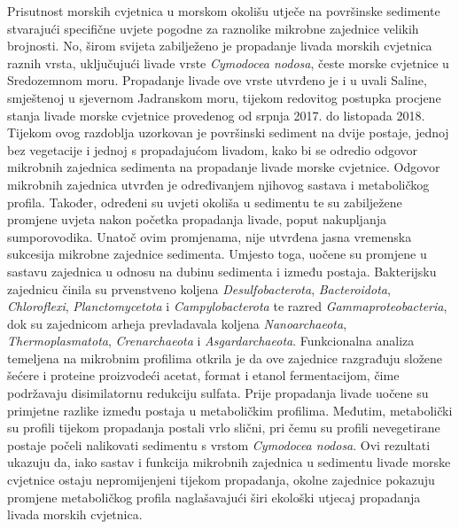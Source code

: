 \documentclass[
  12 pt,
]{book}
\begin{document}
{Prisutnost morskih cvjetnica u morskom okolišu utječe na površinske sedimente stvarajući specifične uvjete pogodne za raznolike mikrobne zajednice velikih brojnosti. No, širom svijeta zabilježeno je propadanje livada morskih cvjetnica raznih vrsta, uključujući livade vrste \emph{Cymodocea nodosa}, česte morske cvjetnice u Sredozemnom moru. Propadanje livade ove vrste utvrđeno je i u uvali Saline, smještenoj u sjevernom Jadranskom moru, tijekom redovitog postupka procjene stanja livade morske cvjetnice provedenog od srpnja 2017. do listopada 2018. Tijekom ovog razdoblja uzorkovan je površinski sediment na dvije postaje, jednoj bez vegetacije i jednoj s propadajućom livadom, kako bi se odredio odgovor mikrobnih zajednica sedimenta na propadanje livade morske cvjetnice. Odgovor mikrobnih zajednica utvrđen je određivanjem njihovog sastava i metaboličkog profila. Također, određeni su uvjeti okoliša u sedimentu te su zabilježene promjene uvjeta nakon početka propadanja livade, poput nakupljanja sumporovodika. Unatoč ovim promjenama, nije utvrđena jasna vremenska sukcesija mikrobne zajednice sedimenta. Umjesto toga, uočene su promjene u sastavu zajednica u odnosu na dubinu sedimenta i između postaja. Bakterijsku zajednicu činila su prvenstveno koljena \emph{Desulfobacterota}, \emph{Bacteroidota}, \emph{Chloroflexi}, \emph{Planctomycetota} i \emph{Campylobacterota} te razred \emph{Gammaproteobacteria}, dok su zajednicom arheja prevladavala koljena \emph{Nanoarchaeota}, \emph{Thermoplasmatota}, \emph{Crenarchaeota} i \emph{Asgardarchaeota}. Funkcionalna analiza temeljena na mikrobnim profilima otkrila je da ove zajednice razgrađuju složene šećere i proteine proizvodeći acetat, format i etanol fermentacijom, čime podržavaju disimilatornu redukciju sulfata. Prije propadanja livade uočene su primjetne razlike između postaja u metaboličkim profilima. Međutim, metabolički su profili tijekom propadanja postali vrlo slični, pri čemu su profili nevegetirane postaje počeli nalikovati sedimentu s vrstom \emph{Cymodocea nodosa}. Ovi rezultati ukazuju da, iako sastav i funkcija mikrobnih zajednica u sedimentu livade morske cvjetnice ostaju nepromijenjeni tijekom propadanja, okolne zajednice pokazuju promjene metaboličkog profila naglašavajući širi ekološki utjecaj propadanja livada morskih cvjetnica.

    
    {
    
        \setlength{\parindent}{0pt}
        
        {
        
}}}
\end{document}
